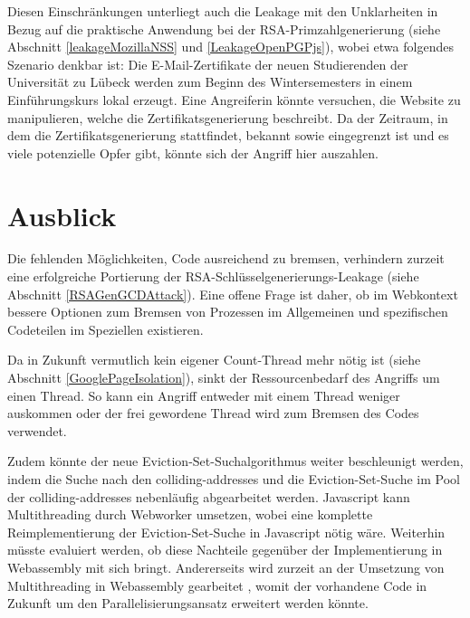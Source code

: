 Diesen Einschränkungen unterliegt auch die Leakage mit den Unklarheiten in Bezug auf die praktische Anwendung bei der RSA-Primzahlgenerierung (siehe Abschnitt \ref{leakageMozillaNSS} und \ref{LeakageOpenPGPjs}), wobei etwa folgendes Szenario denkbar ist:
Die E-Mail-Zertifikate der neuen Studierenden der Universität zu Lübeck werden zum Beginn des Wintersemesters in einem Einführungskurs lokal erzeugt. 
Eine Angreiferin könnte versuchen, die Website zu manipulieren, welche die Zertifikatsgenerierung beschreibt.
Da der Zeitraum, in dem die Zertifikatsgenerierung stattfindet, bekannt sowie eingegrenzt ist und es viele potenzielle Opfer gibt, könnte sich der Angriff hier auszahlen.


\section{Ausblick}


Die fehlenden Möglichkeiten, Code ausreichend zu bremsen, verhindern zurzeit eine erfolgreiche Portierung der RSA-Schlüsselgenerierungs-Leakage (siehe Abschnitt \ref{RSAGenGCDAttack}).
Eine offene Frage ist daher, ob im Webkontext bessere Optionen zum Bremsen von Prozessen im Allgemeinen und spezifischen Codeteilen im Speziellen existieren.

Da in Zukunft vermutlich kein eigener Count-Thread mehr nötig ist (siehe Abschnitt \ref{GooglePageIsolation}), sinkt der Ressourcenbedarf des Angriffs um einen Thread.
So kann ein Angriff entweder mit einem Thread weniger auskommen oder der frei gewordene Thread wird zum Bremsen des Codes verwendet.

Zudem könnte der neue Eviction-Set-Suchalgorithmus weiter beschleunigt werden, indem die Suche nach den colliding-addresses und die Eviction-Set-Suche im Pool der colliding-addresses nebenläufig abgearbeitet werden.
Javascript kann Multithreading durch Webworker umsetzen, wobei eine komplette Reimplementierung der Eviction-Set-Suche in Javascript nötig wäre.
Weiterhin müsste evaluiert werden, ob diese Nachteile gegenüber der Implementierung in Webassembly mit sich bringt. 
Andererseits wird zurzeit an der Umsetzung von Multithreading in Webassembly gearbeitet \cite{WebassemblyThreads}, womit der vorhandene Code in Zukunft um den Parallelisierungsansatz erweitert werden könnte.

